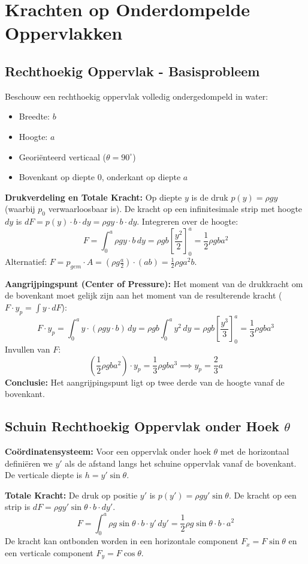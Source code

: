\documentclass[a4paper,11pt,twoside]{report}
\begin{document}
\section{Krachten op Onderdompelde Oppervlakken}
\subsection{Rechthoekig Oppervlak - Basisprobleem}
Beschouw een rechthoekig oppervlak volledig ondergedompeld in water:
\begin{itemize}
    \item Breedte: $b$
    \item Hoogte: $a$
    \item Georiënteerd verticaal ($\theta = 90^\circ$)
    \item Bovenkant op diepte 0, onderkant op diepte $a$
\end{itemize}

\textbf{Drukverdeling en Totale Kracht:}
Op diepte $y$ is de druk $p(y) = \rho g y$ (waarbij $p_0$ verwaarloosbaar is).
De kracht op een infinitesimale strip met hoogte $dy$ is $dF = p(y) \cdot b \cdot dy = \rho g y \cdot b \cdot dy$.
Integreren over de hoogte:
\[
F = \int_0^a \rho g y \cdot b \, dy = \rho g b \left[ \frac{y^2}{2} \right]_0^a = \frac{1}{2} \rho g b a^2
\]
Alternatief: $F = p_{gem} \cdot A = (\rho g \frac{a}{2}) \cdot (ab) = \frac{1}{2} \rho g a^2 b$.

\textbf{Aangrijpingspunt (Center of Pressure):}
Het moment van de drukkracht om de bovenkant moet gelijk zijn aan het moment van de resulterende kracht ($F \cdot y_p = \int y \cdot dF$):
\[
F \cdot y_p = \int_0^a y \cdot (\rho g y \cdot b) \, dy = \rho g b \int_0^a y^2 \, dy = \rho g b \left[ \frac{y^3}{3} \right]_0^a = \frac{1}{3} \rho g b a^3
\]
Invullen van $F$:
\[
\left(\frac{1}{2} \rho g b a^2\right) \cdot y_p = \frac{1}{3} \rho g b a^3 \implies y_p = \frac{2}{3} a
\]
\textbf{Conclusie:} Het aangrijpingspunt ligt op twee derde van de hoogte vanaf de bovenkant.

\subsection{Schuin Rechthoekig Oppervlak onder Hoek \texorpdfstring{$\theta$}{theta}}
\textbf{Coördinatensysteem:}
Voor een oppervlak onder hoek $\theta$ met de horizontaal definiëren we $y'$ als de afstand langs het schuine oppervlak vanaf de bovenkant. De verticale diepte is $h = y' \sin \theta$.

\textbf{Totale Kracht:}
De druk op positie $y'$ is $p(y') = \rho g y' \sin \theta$.
De kracht op een strip is $dF = \rho g y' \sin \theta \cdot b \cdot dy'$.
\[
F = \int_0^a \rho g \sin \theta \cdot b \cdot y' \, dy' = \frac{1}{2} \rho g \sin \theta \cdot b \cdot a^2
\]
De kracht kan ontbonden worden in een horizontale component $F_x = F \sin \theta$ en een verticale component $F_y = F \cos \theta$.
\end{document}
